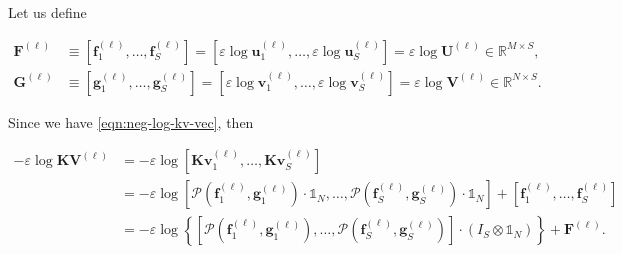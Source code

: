 Let us define

\begin{equation*}
  \begin{aligned}
    \mathbf{F}^{(\ell)}
     & \equiv \left[
    \mathbf{f}_1^{(\ell)}, \ldots, \mathbf{f}_S^{(\ell)}
    \right]
    =
    \left[
    \varepsilon \log \mathbf{u}_1^{(\ell)}, \ldots, \varepsilon \log \mathbf{u}_S^{(\ell)}
    \right]
    = \varepsilon \log \mathbf{U}^{(\ell)} \in \mathbb{R}^{M \times S}, \\
    \mathbf{G}^{(\ell)}
     & \equiv \left[
      \mathbf{g}^{(\ell)}_1, \ldots, \mathbf{g}^{(\ell)}_S
      \right]
    = \left[
      \varepsilon \log \mathbf{v}^{(\ell)}_1, \ldots, \varepsilon \log \mathbf{v}^{(\ell)}_S
      \right]
    = \varepsilon \log \mathbf{V}^{(\ell)} \in \mathbb{R}^{N \times S}.
  \end{aligned}
\end{equation*}




Since we have \cref{eqn:neg-log-kv-vec}, then

\begin{equation*}
  \begin{aligned}
    - \varepsilon \log \mathbf{K} \mathbf{V}^{(\ell)}
     & =
    - \varepsilon \log \left[
      \mathbf{K} \mathbf{v}^{(\ell)}_1, \ldots, \mathbf{K} \mathbf{v}^{(\ell)}_S
    \right] \\
     & =
    - \varepsilon \log \left[
      \mathcal{P} \left(\mathbf{f}^{(\ell)}_1, \mathbf{g}^{(\ell)}_1\right) \cdot \mathbb{1}_N,
      \ldots,
      \mathcal{P} \left(\mathbf{f}^{(\ell)}_S, \mathbf{g}^{(\ell)}_S\right) \cdot \mathbb{1}_N
      \right] + \left[
      \mathbf{f}^{(\ell)}_1, \ldots, \mathbf{f}^{(\ell)}_S
    \right] \\
     & =
    - \varepsilon \log
    \left\{
    \left[
      \mathcal{P} \left(\mathbf{f}^{(\ell)}_1, \mathbf{g}^{(\ell)}_1\right),
      \ldots,
      \mathcal{P} \left(\mathbf{f}^{(\ell)}_S, \mathbf{g}^{(\ell)}_S\right)
      \right] \cdot
    \left(I_S \otimes \mathbb{1}_N\right)
    \right\}
    + \mathbf{F}^{(\ell)}.
  \end{aligned}
\end{equation*}

